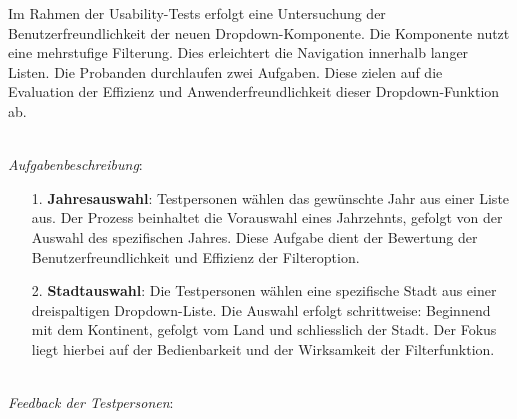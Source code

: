Im Rahmen der Usability-Tests erfolgt eine Untersuchung der Benutzerfreundlichkeit der neuen Dropdown-Komponente.  
Die Komponente nutzt eine mehrstufige Filterung. 
Dies erleichtert die Navigation innerhalb langer Listen. 
Die Probanden durchlaufen zwei Aufgaben. 
Diese zielen auf die Evaluation der Effizienz und Anwenderfreundlichkeit dieser Dropdown-Funktion ab. 

 \\
\emph{Aufgabenbeschreibung}: 

\begin{itemize}
    \item[1.] \textbf{Jahresauswahl}: 
              Testpersonen wählen das gewünschte Jahr aus einer Liste aus. 
              Der Prozess beinhaltet die Vorauswahl eines Jahrzehnts, gefolgt von der Auswahl des spezifischen Jahres. 
              Diese Aufgabe dient der Bewertung der Benutzerfreundlichkeit und Effizienz der Filteroption. 
    \item[2.] \textbf{Stadtauswahl}: 
              Die Testpersonen wählen eine spezifische Stadt aus einer dreispaltigen Dropdown-Liste. 
              Die Auswahl erfolgt schrittweise: Beginnend mit dem Kontinent, gefolgt vom Land und schliesslich der Stadt. 
              Der Fokus liegt hierbei auf der Bedienbarkeit und der Wirksamkeit der Filterfunktion. 
\end{itemize}

 \\
\emph{Feedback der Testpersonen}: 

